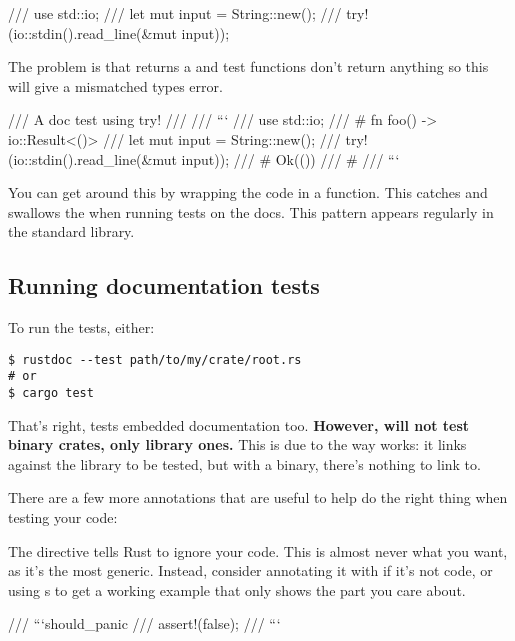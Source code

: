 \begin{rustc}
/// use std::io;
/// let mut input = String::new();
/// try!(io::stdin().read_line(&mut input));
\end{rustc}

The problem is that  returns a  and test functions don't return anything so this will give a 
mismatched types error.

\begin{rustc}
/// A doc test using try!
///
/// ```
/// use std::io;
/// # fn foo() -> io::Result<()> {
/// let mut input = String::new();
/// try!(io::stdin().read_line(&mut input));
/// # Ok(())
/// # }
/// ```
\end{rustc}

You can get around this by wrapping the code in a function. This catches and swallows the  when running tests on 
the docs. This pattern appears regularly in the standard library.

\subsection*{Running documentation tests}

To run the tests, either:

\begin{verbatim}
$ rustdoc --test path/to/my/crate/root.rs
# or
$ cargo test
\end{verbatim}

That's right,  tests embedded documentation too. \textbf{However,  will not test binary crates, 
only library ones.} This is due to the way  works: it links against the library to be tested, but with a binary, 
there’s nothing to link to.

\blank

There are a few more annotations that are useful to help  do the right thing when testing your code:

\begin{rustc}
/// ```ignore
/// fn foo() {
/// ```
\end{rustc}

The  directive tells Rust to ignore your code. This is almost never what you want, as it's the most generic. Instead, 
consider annotating it with  if it's not code, or using \code{\#}s to get a working example that only shows the part 
you care about.

\begin{rustc}
/// ```should_panic
/// assert!(false);
/// ```
\end{rustc}


